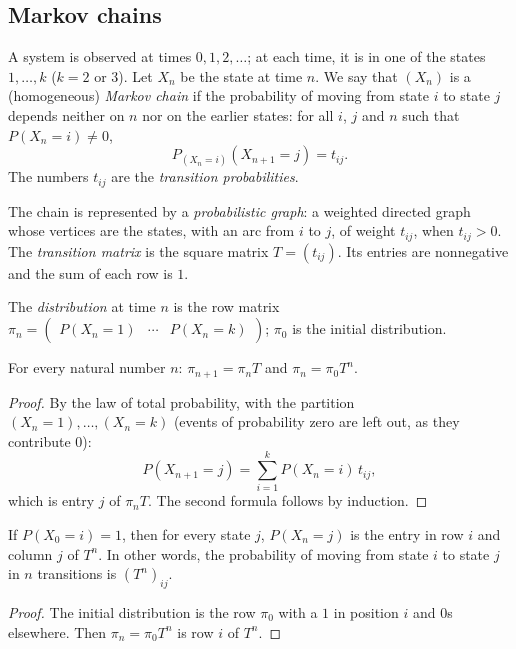 \subsection{Markov chains}
\begin{definition}
A system is observed at times $0,1,2,\dots$; at each time, it is in one of the states $1,\dots,k$ ($k=2$ or $3$). Let $X_n$ be the state at time $n$. We say that $(X_n)$ is a (homogeneous) \emph{Markov chain} if the probability of moving from state $i$ to state $j$ depends neither on $n$ nor on the earlier states: for all $i$, $j$ and $n$ such that $P(X_n=i)\neq0$,
\[P_{(X_n=i)}(X_{n+1}=j)=t_{ij}.\]
The numbers $t_{ij}$ are the \emph{transition probabilities}.
\end{definition}
\begin{definition}
The chain is represented by a \emph{probabilistic graph}: a weighted directed graph whose vertices are the states, with an arc from $i$ to $j$, of weight $t_{ij}$, when $t_{ij}>0$. The \emph{transition matrix} is the square matrix $T=(t_{ij})$. Its entries are nonnegative and the sum of each row is $1$.
\end{definition}
\begin{definition}[Distribution]
The \emph{distribution} at time $n$ is the row matrix $\pi_n=\begin{pmatrix}P(X_n=1)&\cdots&P(X_n=k)\end{pmatrix}$; $\pi_0$ is the initial distribution.
\end{definition}
\begin{theorem}
For every natural number $n$: $\pi_{n+1}=\pi_nT$ and $\pi_n=\pi_0T^n$.
\end{theorem}
\begin{proof}
By the law of total probability, with the partition $\left(X_n=1\right),\dots,\left(X_n=k\right)$ (events of probability zero are left out, as they contribute $0$):
\[P(X_{n+1}=j)=\sum_{i=1}^{k}P(X_n=i)\,t_{ij},\]
which is entry $j$ of $\pi_nT$. The second formula follows by induction.
\end{proof}
\begin{theorem}
If $P(X_0=i)=1$, then for every state $j$, $P(X_n=j)$ is the entry in row $i$ and column $j$ of $T^n$. In other words, the probability of moving from state $i$ to state $j$ in $n$ transitions is $\left(T^n\right)_{ij}$.
\end{theorem}
\begin{proof}
The initial distribution is the row $\pi_0$ with a $1$ in position $i$ and $0$s elsewhere. Then $\pi_n=\pi_0T^n$ is row $i$ of $T^n$.
\end{proof}
